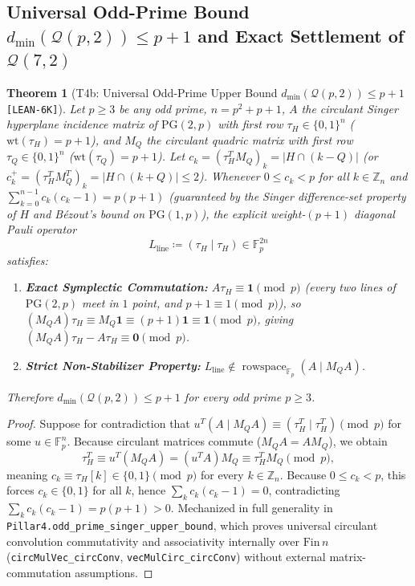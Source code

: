 \documentclass[11pt,letterpaper]{article}
\theoremstyle{plain}
\newtheorem{theorem}{Theorem}[section]
\theoremstyle{definition}
\theoremstyle{remark}
\newcommand{\F}{\mathbb{F}}
\newcommand{\Z}{\mathbb{Z}}
\newcommand{\PG}{\mathrm{PG}}
\newcommand{\Qcode}{\mathcal{Q}}
\newcommand{\rowsp}{\operatorname{rowspace}}
\newcommand{\leanref}[1]{\textnormal{\texttt{\footnotesize #1}}}
\newcommand{\tagbadge}[1]{\textnormal{\texttt{\small [#1]}}}
\begin{document}
\subsection{Universal Odd-Prime Bound \texorpdfstring{$d_{\min}(\Qcode(p,2))\le p+1$}{d\_min(Q(p,2))<=p+1} and Exact Settlement of \texorpdfstring{$\Qcode(7,2)$}{Q(7,2)}}

\begin{theorem}[{T4b: Universal Odd-Prime Upper Bound $d_{\min}(\Qcode(p,2))\le p+1$ \tagbadge{LEAN-6K}}]
\label{thm:t4b}
Let $p\ge 3$ be any odd prime, $n=p^2+p+1$, $A$ the circulant Singer hyperplane incidence matrix of $\PG(2,p)$ with first row $\tau_H\in\{0,1\}^n$ ($\mathrm{wt}(\tau_H)=p+1$), and $M_Q$ the circulant quadric matrix with first row $\tau_Q\in\{0,1\}^n$ ($\mathrm{wt}(\tau_Q)=p+1$). Let $c_k=(\tau_H^T M_Q)_k=|H\cap(k-Q)|$ (or $c_k^+=(\tau_H^T M_Q^T)_k=|H\cap(k+Q)|\le 2$). Whenever $0\le c_k<p$ for all $k\in\Z_n$ and $\sum_{k=0}^{n-1}c_k(c_k-1)=p(p+1)$ (guaranteed by the Singer difference-set property of $H$ and B\'ezout's bound on $\PG(1,p)$), the explicit weight-$(p+1)$ diagonal Pauli operator
\[
  L_{\mathrm{line}} \coloneqq (\tau_H \mid \tau_H) \in \F_p^{2n}
\]
satisfies:
\begin{enumerate}[leftmargin=2em,itemsep=2pt]
  \item \textbf{Exact Symplectic Commutation:} $A\tau_H \equiv \mathbf{1}\pmod p$ (every two lines of $\PG(2,p)$ meet in $1$ point, and $p+1\equiv 1\pmod p$), so $(M_Q A)\tau_H\equiv M_Q\mathbf{1}\equiv (p+1)\mathbf{1}\equiv\mathbf{1}\pmod p$, giving $(M_Q A)\tau_H - A\tau_H \equiv \mathbf{0}\pmod p$.
  \item \textbf{Strict Non-Stabilizer Property:} $L_{\mathrm{line}}\notin \rowsp_{\F_p}(A\mid M_Q A)$.
\end{enumerate}
Therefore $d_{\min}(\Qcode(p,2))\le p+1$ for every odd prime $p\ge 3$.
\end{theorem}

\begin{proof}
Suppose for contradiction that $u^T(A\mid M_Q A)\equiv (\tau_H^T\mid \tau_H^T)\pmod p$ for some $u\in\F_p^n$. Because circulant matrices commute ($M_Q A=A M_Q$), we obtain
\[
  \tau_H^T \equiv u^T(M_Q A) = (u^T A)M_Q \equiv \tau_H^T M_Q \pmod p,
\]
meaning $c_k\equiv \tau_H[k]\in\{0,1\}\pmod p$ for every $k\in\Z_n$. Because $0\le c_k<p$, this forces $c_k\in\{0,1\}$ for all $k$, hence $\sum_k c_k(c_k-1)=0$, contradicting $\sum_k c_k(c_k-1)=p(p+1)>0$. Mechanized in full generality in \leanref{Pillar4.odd\_prime\_singer\_upper\_bound}, which proves universal circulant convolution commutativity and associativity internally over $\mathrm{Fin}\,n$ (\leanref{circMulVec\_circConv}, \leanref{vecMulCirc\_circConv}) without external matrix-commutation assumptions.
\end{proof}
\end{document}
